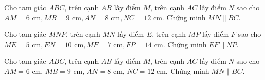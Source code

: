 \begin{bt}%
	Cho tam giác $ABC$, trên cạnh $AB$ lấy điểm $M$, trên cạnh $AC$ lấy điểm $N$ sao cho $AM = 6\text{ cm}, MB = 9\text{ cm}, AN = 8\text{ cm}, NC = 12\text{ cm}$. Chứng minh $MN \parallel BC$.
\end{bt}

\begin{bt}%
	Cho tam giác $MNP$, trên cạnh $MN$ lấy điểm $E$, trên cạnh $MP$ lấy điểm $F$ sao cho $ME = 5\text{ cm}, EN = 10\text{ cm}, MF = 7\text{ cm}, FP = 14\text{ cm}$. Chứng minh $EF \parallel NP$.
\end{bt}

\begin{bt}%
	Cho tam giác $ABC$, trên cạnh $AB$ lấy điểm $M$, trên cạnh $AC$ lấy điểm $N$ sao cho $AM = 6\text{ cm}$, $MB = 9\text{ cm}$, $AN = 8\text{ cm}$, $NC = 12\text{ cm}$. Chứng minh $MN \parallel BC$.
\end{bt}

